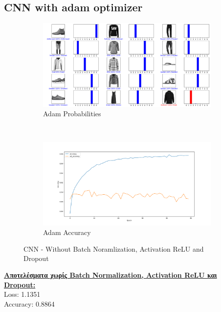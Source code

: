 \documentclass{article}
\begin{document}
\subsection*{CNN with adam optimizer}
	\begin{figure}[h!]
		\centering
		\begin{subfigure}[t]{0.5\textwidth}
			\centering
			\includegraphics[width=\linewidth]{../exercise3_3/images/fashion_cnn_without_batch_relu_dropout_probabilities.png}
			\caption{Adam Probabilities}
		\end{subfigure}%
		~
		\begin{subfigure}[t]{0.5\textwidth}
			\centering
			\includegraphics[width=\linewidth]{../exercise3_3/images/fashion_cnn_without_batch_relu_dropout_accuracy.png}
			\caption{Adam Accuracy}
		\end{subfigure}
		\caption{CNN - Without Batch Noramlization, Activation ReLU and Dropout}
	\end{figure}
	\noindent
	\textbf{\underline{Aποτελέσματα χωρίς Batch Normalization, Activation ReLU και Dropout:}}\\
	Loss: 1.1351 \\
	Accuracy: 0.8864
	
\end{document}
